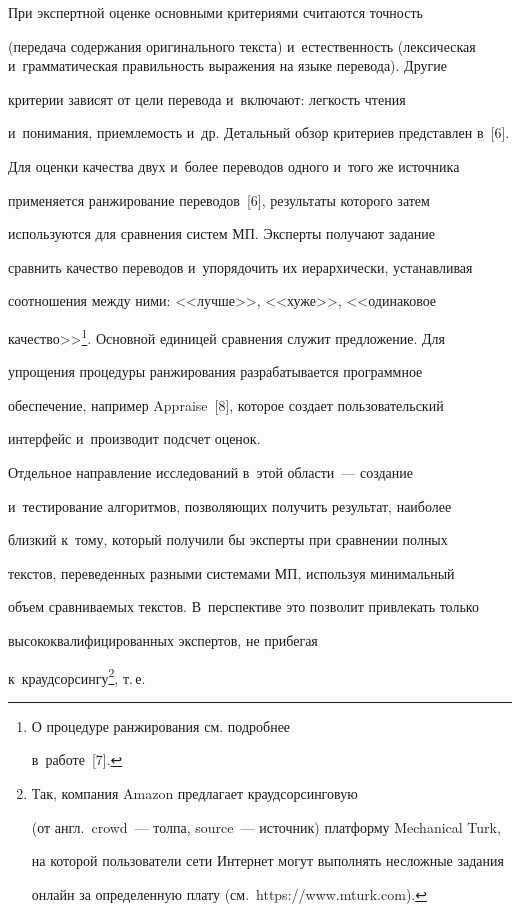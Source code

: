   

  При экспертной оценке основными критериями считаются точность 

(передача содержания оригинального текста) и~естественность (лексическая и~грамматическая правильность выражения на языке перевода). Другие 

критерии зависят от цели перевода и~включают: легкость чтения 

и~понимания, приемлемость и~др. Детальный обзор критериев представлен в~[6].

  

  Для оценки качества двух и~более переводов одного и~того же источника 

применяется ранжирование переводов~[6], результаты которого затем 

используются для сравнения систем МП. Эксперты получают задание 

сравнить качество переводов и~упорядочить их иерархически, устанавливая 

соотношения между ними: <<лучше>>, <<хуже>>, <<одинаковое 

качество>>\footnote{О процедуре ранжирования см. подробнее 

в~работе~[7].}. Основной единицей сравнения служит предложение. Для 

упрощения процедуры ранжирования разрабатывается программное 

обеспечение, например Appraise~[8], которое создает пользовательский 

интерфейс и~производит подсчет оценок.

  

  Отдельное направление исследований в~этой области~--- создание 

и~тестирование алгоритмов, позволяющих получить результат, наиболее 

близкий к~тому, который получили бы эксперты при сравнении полных 

текстов, переведенных разными системами МП, используя минимальный 

объем сравниваемых текстов. В~перспективе это позволит привлекать только 

высококвалифицированных экспертов, не прибегая 

к~краудсорсингу\footnote{Так, компания Amazon предлагает краудсорсинговую 

(от англ.\ crowd~--- толпа, source~--- источник) платформу Mechanical Turk, 

на которой пользователи сети Интернет могут выполнять несложные задания 

онлайн за определенную плату (см.\ {\sf https://www.mturk.com}).}, т.\,е.\ 

